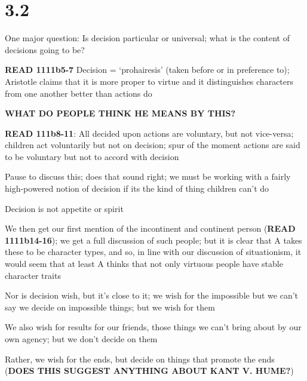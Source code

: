 \documentclass[11pt]{article}
\begin{document}
\section*{3.2}

\noindent One major question: Is decision particular or universal; what is the content of decisions going to be?

\noindent\textbf{READ 1111b5-7} Decision = `prohairesis' (taken before or in preference to); Aristotle claims that it is more proper to virtue and it distinguishes characters from one another better than actions do
\vspace*{2mm}

\noindent\textbf{WHAT DO PEOPLE THINK HE MEANS BY THIS?}
\vspace*{2mm}

\noindent\textbf{READ 111b8-11}: All decided upon actions are voluntary, but not vice-versa; children act voluntarily but not on decision; spur of the moment actions are said to be voluntary but not to accord with decision
\vspace*{2mm}

\noindent Pause to discuss this; does that sound right; we must be working with a fairly high-powered notion of decision if its the kind of thing children can't do
\vspace*{2mm}

\noindent Decision is not appetite or spirit
\vspace*{2mm}

\noindent We then get our first mention of the incontinent and continent person (\textbf{READ 1111b14-16}); we get a full discussion of such people; but it is clear that A takes these to be character types, and so, in line with our discussion of situationism, it would seem that at least A thinks that not only virtuous people have stable character traits
\vspace*{2mm}

\noindent Nor is decision wish, but it's close to it; we wish for the impossible but we can't say we decide on impossible things; but we wish for them
\vspace*{2mm}

\noindent We also wish for results for our friends, those things we can't bring about by our own agency; but we don't decide on them
\vspace*{2mm}

\noindent Rather, we wish for the ends, but decide on things that promote the ends (\textbf{DOES THIS SUGGEST ANYTHING ABOUT KANT V. HUME?})
\vspace*{2mm}
\end{document}
